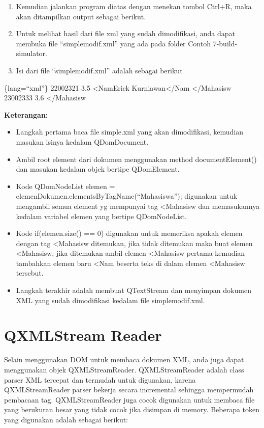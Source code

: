\begin{enumerate}
\def\labelenumi{\arabic{enumi}.}
\setcounter{enumi}{3}
\tightlist
\item
  Kemudian jalankan program diatas dengan menekan tombol Ctrl+R, maka
  akan ditampilkan output sebagai berikut.
\item
  Untuk melihat hasil dari file xml yang sudah dimodifikasi, anda dapat
  membuka file ``simplemodif.xml'' yang ada pada folder Contoh
  7-build-simulator.
\item
  Isi dari file ``simplemodif.xml'' adalah sebagai berikut
\end{enumerate}

\{lang=``xml''\} 22002321 3.5 \textless{}NamErick
Kurniawan\textless{}/Nam \textless{}/Mahasisw 23002333 3.6
\textless{}/Mahasisw

\textbf{Keterangan:}

\begin{itemize}
\tightlist
\item
  Langkah pertama baca file simple.xml yang akan dimodifikasi, kemudian
  masukan isinya kedalam QDomDocument.
\item
  Ambil root element dari dokumen menggunakan method documentElement()
  dan masukan kedalam objek bertipe QDomElement.
\item
  Kode QDomNodeList elemen =
  elemenDokumen.elementsByTagName(``Mahasiswa''); digunakan untuk
  mengambil semua element yg mempunyai tag \textless{}Mahasisw dan
  memasukannya kedalam variabel elemen yang bertipe QDomNodeList.
\item
  Kode if(elemen.size() == 0) digunakan untuk memeriksa apakah elemen
  dengan tag \textless{}Mahasisw ditemukan, jika tidak ditemukan maka
  buat elemen \textless{}Mahasisw, jika ditemukan ambil elemen
  \textless{}Mahasisw pertama kemudian tambahkan elemen baru
  \textless{}Nam beserta teks di dalam elemen \textless{}Mahasisw
  tersebut.
\item
  Langkah terakhir adalah membuat QTextStream dan menyimpan dokumen XML
  yang sudah dimodifikasi kedalam file simplemodif.xml.
\end{itemize}

\section{QXMLStream Reader}\label{qxmlstream-reader}

Selain menggunakan DOM untuk membaca dokumen XML, anda juga dapat
menggunakan objek QXMLStreamReader. QXMLStreamReader adalah class parser
XML tercepat dan termudah untuk digunakan, karena QXMLStreamReader
parser bekerja secara incremental sehingga mempermudah pembacaan tag.
QXMLStreamReader juga cocok digunakan untuk membaca file yang berukuran
besar yang tidak cocok jika disimpan di memory. Beberapa token yang
digunakan adalah sebagai berikut:

